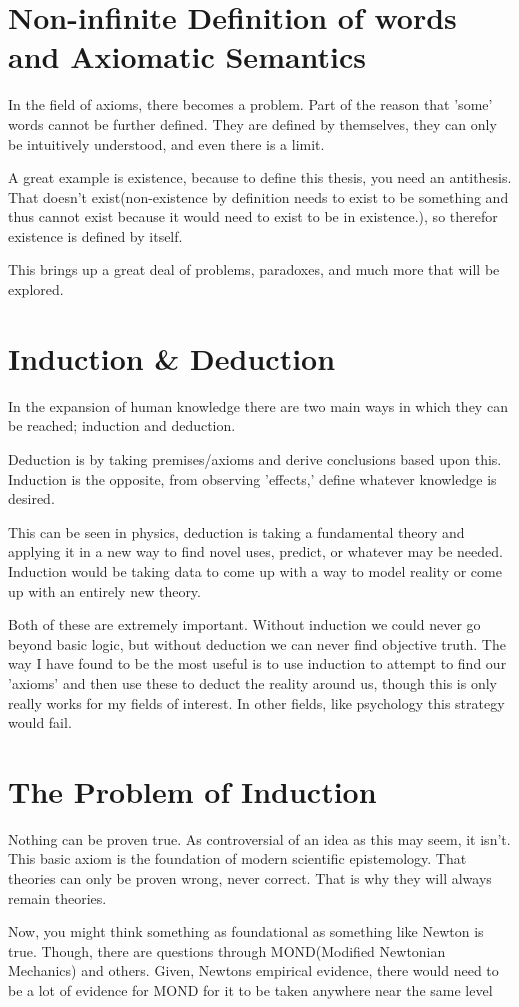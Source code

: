 \section{Non-infinite Definition of words and Axiomatic Semantics}
\par In the field of axioms, there becomes a problem. Part of the reason that 'some' words cannot be further defined. They are defined by themselves, they can only be intuitively understood, and even there is a limit.
\par A great example is existence, because to define this thesis, you need an antithesis. That doesn't exist(non-existence by definition needs to exist to be something and thus cannot exist because it would need to exist to be in existence.), so therefor existence is defined by itself.
\par This brings up a great deal of problems, paradoxes, and much more that will be explored.
\section{Induction \& Deduction}
\par In the expansion of human knowledge there are two main ways in which they can be reached; induction and deduction.
\par Deduction is by taking premises/axioms and derive conclusions based upon this. Induction is the opposite, from observing 'effects,' define whatever knowledge is desired.
\par This can be seen in physics, deduction is taking a fundamental theory and applying it in a new way to find novel uses, predict, or whatever may be needed. Induction would be taking data to come up with a way to model reality or come up with an entirely new theory.
\par Both of these are extremely important. Without induction we could never go beyond basic logic, but without deduction we can never find objective truth. The way I have found to be the most useful is to use induction to attempt to find our 'axioms' and then use these to deduct the reality around us, though this is only really works for my fields of interest. In other fields, like psychology this strategy would fail.

\section{The Problem of Induction}
\par Nothing can be proven true. As controversial of an idea as this may seem, it isn't. This basic axiom is the foundation of modern scientific epistemology. That theories can only be proven wrong, never correct. That is why they will always remain theories.
\par Now, you might think something as foundational as something like Newton is true. Though, there are questions through MOND(Modified Newtonian Mechanics) and others. Given, Newtons empirical evidence, there would need to be a lot of evidence for MOND for it to be taken anywhere near the same level
